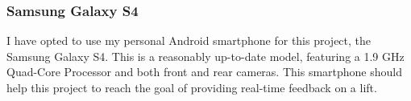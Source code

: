 \subsubsection{Samsung Galaxy S4}

I have opted to use my personal Android smartphone for this project, the Samsung Galaxy S4\cite{s4}. This is a reasonably up-to-date model, featuring a 1.9 GHz Quad-Core Processor and both front and rear cameras. This smartphone should help this project to reach the goal of providing real-time feedback on a lift.